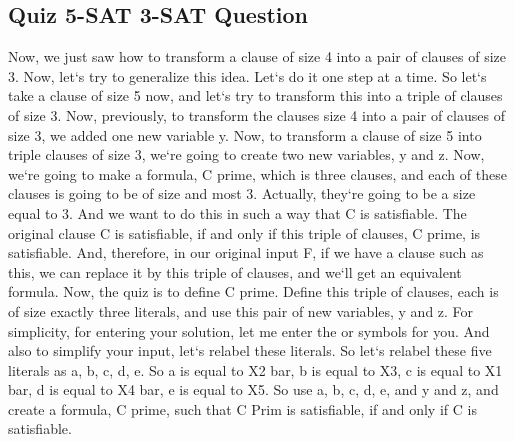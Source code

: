 \subsection{Quiz  5-SAT 3-SAT Question}
Now, we just saw how to transform a clause of size 4 into a pair of clauses of size 3.
Now, let`s try to generalize this idea.
Let`s do it one step at a time.
So let`s take a clause of size 5 now, and let`s try to transform this into a triple of clauses of size 3.
Now, previously, to transform the clauses size 4 into a pair of clauses of size 3, we added one new variable y.
Now, to transform a clause of size 5 into triple clauses of size 3, we`re going to create two new variables, y and z.
Now, we`re going to make a formula, C prime, which is three clauses, and each of these clauses is going to be of size and most 3.
Actually, they`re going to be a size equal to 3.
And we want to do this in such a way that C is satisfiable.
The original clause C is satisfiable, if and only if this triple of clauses, C prime, is satisfiable.
And, therefore, in our original input F, if we have a clause such as this, we can replace it by this triple of clauses, and we`ll get an equivalent formula.
Now, the quiz is to define C prime.
Define this triple of clauses, each is of size exactly three literals, and use this pair of new variables, y and z.
For simplicity, for entering your solution, let me enter the or symbols for you.
And also to simplify your input, let`s relabel these literals.
So let`s relabel these five literals as a, b, c, d, e.
So a is equal to X2 bar, b is equal to X3, c is equal to X1 bar, d is equal to X4 bar, e is equal to X5.
So use a, b, c, d, e, and y and z, and create a formula, C prime, such that C Prim is satisfiable, if and only if C is satisfiable.

